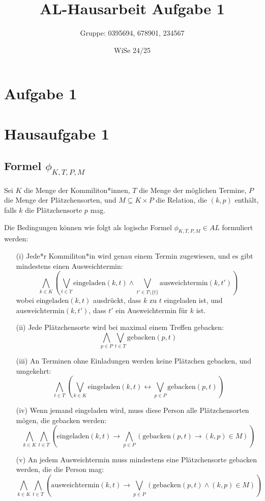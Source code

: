 \documentclass[12pt,a4paper]{article}
\title{AL-Hausarbeit Aufgabe 1}
\author{Gruppe: 0395694, 678901, 234567}
\date{WiSe 24/25}
\begin{document}
\maketitle
\section*{Aufgabe 1}

\section*{Hausaufgabe 1}

\subsection*{Formel $\phi_{K,T,P,M}$}

Sei $K$ die Menge der Kommiliton*innen, $T$ die Menge der möglichen Termine, $P$ die Menge der Plätzchensorten, 
und $M \subseteq K \times P$ die Relation, die $(k, p)$ enthält, falls $k$ die Plätzchensorte $p$ mag.

Die Bedingungen können wie folgt als logische Formel $\phi_{K,T,P,M} \in AL$ formuliert werden:

\begin{itemize}
    \item[(i)] Jede*r Kommiliton*in wird genau einem Termin zugewiesen, und es gibt mindestens einen Ausweichtermin:
    \[
    \bigwedge_{k \in K} \left( \bigvee_{t \in T} \text{eingeladen}(k, t) \land \bigvee_{t' \in T \setminus \{t\}} \text{ausweichtermin}(k, t') \right)
    \]
    wobei $\text{eingeladen}(k, t)$ ausdrückt, dass $k$ zu $t$ eingeladen ist, und $\text{ausweichtermin}(k, t')$, dass $t'$ ein Ausweichtermin für $k$ ist.

    \item[(ii)] Jede Plätzchensorte wird bei maximal einem Treffen gebacken:
    \[
    \bigwedge_{p \in P} \bigvee_{t \in T} \text{gebacken}(p, t)
    \]

    \item[(iii)] An Terminen ohne Einladungen werden keine Plätzchen gebacken, und umgekehrt:
    \[
    \bigwedge_{t \in T} \left( \bigvee_{k \in K} \text{eingeladen}(k, t) \leftrightarrow \bigvee_{p \in P} \text{gebacken}(p, t) \right)
    \]

    \item[(iv)] Wenn jemand eingeladen wird, muss diese Person alle Plätzchensorten mögen, die gebacken werden:
    \[
    \bigwedge_{k \in K} \bigwedge_{t \in T} \left( \text{eingeladen}(k, t) \rightarrow \bigwedge_{p \in P} (\text{gebacken}(p, t) \rightarrow (k, p) \in M) \right)
    \]

    \item[(v)] An jedem Ausweichtermin muss mindestens eine Plätzchensorte gebacken werden, die die Person mag:
    \[
    \bigwedge_{k \in K} \bigwedge_{t \in T} \left( \text{ausweichtermin}(k, t) \rightarrow \bigvee_{p \in P} (\text{gebacken}(p, t) \land (k, p) \in M) \right)
    \]
\end{itemize}
\end{document}
